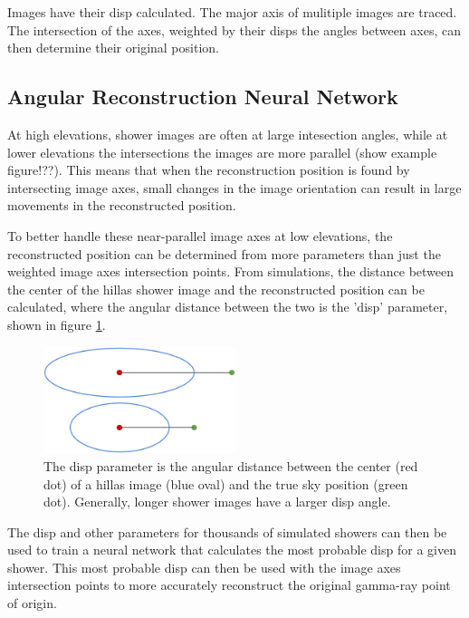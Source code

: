 Images have their disp calculated.
The major axis of mulitiple images are traced.
The intersection of the axes, weighted by their disps the angles between axes, can then determine their original position.

\subsection{Angular Reconstruction Neural Network}
At high elevations, shower images are often at large intesection angles, while at lower elevations the intersections the images are more parallel (show example figure!??).
This means that when the reconstruction position is found by intersecting image axes, small changes in the image orientation can result in large movements in the reconstructed position.

To better handle these near-parallel image axes at low elevations, the reconstructed position can be determined from more parameters than just the weighted image axes intersection points.
From simulations, the distance between the center of the hillas shower image and the reconstructed position can be calculated, where the angular distance between the two is the 'disp' parameter\cite{Senturk:2011}, shown in figure \ref{fig:dispdiagram}.

\begin{figure}[ht]
  \begin{center}
    \includegraphics[width=0.5\textwidth]{images/disp_diagram.eps}
    \caption[Angular Reconstruction Disp]{The disp parameter is the angular distance between the center (red dot) of a hillas image (blue oval) and the true sky position (green dot).  Generally, longer shower images have a larger disp angle.}\label{fig:dispdiagram}
  \end{center}
\end{figure}

The disp and other parameters for thousands of simulated showers can then be used to train a neural network that calculates the most probable disp for a given shower.
This most probable disp can then be used with the image axes intersection points to more accurately reconstruct the original gamma-ray point of origin.

